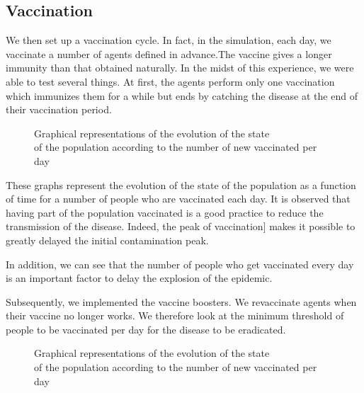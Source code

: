 \documentclass[a4paper, 12pt]{report}
\begin{document}
\newpage

\subsection{Vaccination}

We then set up a vaccination cycle. In fact, in the simulation, each day, we vaccinate a number of agents defined in advance.The vaccine gives a longer immunity than that obtained
naturally. In the midst of this experience, we were able to test several things. At first, the agents perform only one vaccination which immunizes them for a while but ends
by catching the disease at the end of their vaccination period.

\begin{figure}[h]
	\centering
	\qquad
	\centering
	\qquad
	\caption{Graphical representations of the evolution of the state \\ of the population according to the number of new vaccinated per day}

\end{figure}

These graphs represent the evolution of the state of the population as a function of time for a number of people who are vaccinated each day.
It is observed that having part of the population vaccinated is a good practice to reduce the transmission of the disease. Indeed, the peak of vaccination] makes it possible to
greatly delayed the initial contamination peak.

\newpage

In addition, we can see that the number of people who get vaccinated every day is an important factor to delay the explosion of the epidemic.

Subsequently, we implemented the vaccine boosters. We revaccinate agents when their vaccine no longer works. We therefore look at the minimum threshold of people to be vaccinated per day
for the disease to be eradicated.

\begin{figure}[h]
	\centering
	\qquad
	\centering
	\qquad
	\caption{Graphical representations of the evolution of the state \\ of the population according to the number of new vaccinated per day}

\end{figure}
\end{document}
